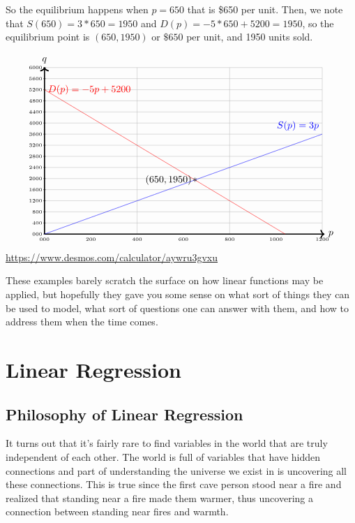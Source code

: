 \begin{example}
\begin{enumerate}
So the equilibrium happens when $p=650$ that is \$650 per unit.  Then, we note that $S(650)=3*650=1950$ and $D(p)=-5*650+5200=1950$, so the equilibrium point is $(650, 1950)$ or $\$650$ per unit, and 1950 units sold.

$$\begin{tikzpicture}[yscale=6/60, xscale=10/12]
    \draw[gray!50, thin, step=4] (0,0) grid (12,60);
    \draw[very thick,->] (0,0) -- (12.1,0) node[right] {$p$};
    \draw[very thick,->] (0,0) -- (0,60.1) node[above] {$q$};

    \foreach \x in {0,2,...,12} \draw (\x,0.05) -- (\x,-0.05) node[below] {\tiny\x00};
    \foreach \y in {0,4,...,60} \draw (-0.05,\y) -- (0.05,\y) node[left] {\tiny\y00};



    \draw[scale=1,domain=0:12,smooth,variable=\x,blue] plot ({\x},{3*\x});

    \draw[scale=1,domain=0:10.4,smooth,variable=\x,red] plot ({\x},{-5*\x+52});

\draw[red] (0,52) --node[right]{$D(p)=-5p+5200$}(0,52);
\draw[blue] (12,36) --node[above left]{$S(p)=3p$}(12,36);

    \node at (6.5,19.5){$*$};
\draw (6.5,19.5) --node[left]{$(650,1950)$}(6.5,19.5);



\end{tikzpicture}$$
\url{https://www.desmos.com/calculator/aywru3gvxu}
\end{enumerate}

\end{example}

These examples barely scratch the surface on how linear functions may be applied, but hopefully they gave you some sense on what sort of things they can be used to model, what sort of questions one can answer with them, and how to address them when the time comes.

\section{Linear Regression}\label{Section:LinearRegression}


\subsection{Philosophy of Linear Regression}

It turns out that it's fairly rare to find variables in the world that are truly independent of each other.  The world is full of variables that have hidden connections and part of understanding the universe we exist in is uncovering all these connections.  This is true since the first cave person stood near a fire and realized that standing near a fire made them warmer, thus uncovering a connection between standing near fires and warmth.\\


